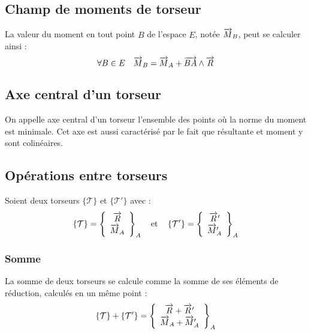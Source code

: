 	\subsection{Champ de moments de torseur}
		\label{sec:champ-de-moments}
		La valeur du moment en tout point $B$ de l'espace $E$, notée $\overrightarrow{M}_B$, peut se calculer ainsi :
		\begin{equation}
			\label{eq:champ-de-moments}
			\forall B\in E \quad \overrightarrow{M}_B=\overrightarrow{M}_A+\overrightarrow{BA}\wedge\overrightarrow{R}
		\end{equation}
		
	\subsection{Axe central d'un torseur}
		\label{sec:axe-central}
		On appelle axe central d'un torseur l'ensemble des points où la norme du moment est minimale. Cet axe est aussi caractérisé par le fait que résultante et moment y sont colinéaires.
		
		
	\subsection{Opérations entre torseurs}
		Soient deux torseurs $\lbrace\mathcal{T}\rbrace$ et $\lbrace\mathcal{T}'\rbrace$ avec :
		\begin{equation}
			\left\lbrace\mathcal{T}\right\rbrace=\left\lbrace\begin{array}{c}
				\overrightarrow{R}\\
				\overrightarrow{M}_A
			\end{array}\right\rbrace_A
			\quad
			\text{et}
			\quad
			\left\lbrace\mathcal{T}'\right\rbrace=\left\lbrace\begin{array}{c}
				\overrightarrow{R}'\\
				\overrightarrow{M}_A'
			\end{array}\right\rbrace_A					
		\end{equation}

		\subsubsection{Somme}
		La somme de deux torseurs se calcule comme la somme de ses éléments de réduction, calculés en un même point :
		\begin{equation}
			\left\lbrace\mathcal{T}\right\rbrace+\left\lbrace\mathcal{T}'\right\rbrace=
			\left\lbrace\begin{array}{c}
				\overrightarrow{R}+\overrightarrow{R}'\\
				\overrightarrow{M}_A+\overrightarrow{M}_A'
			\end{array}\right\rbrace_A			
		\end{equation}
		
